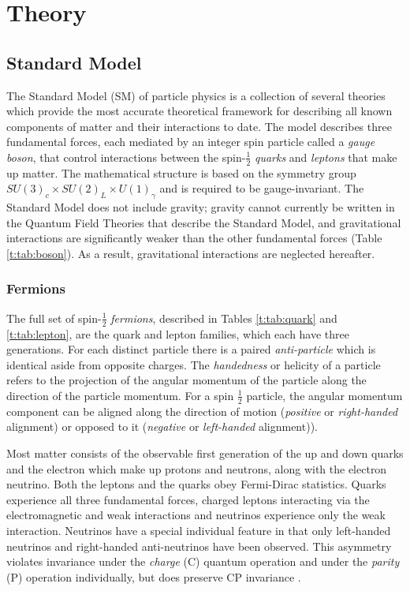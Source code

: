 \chapter{Theory}\label{c:Theory}

\section{Standard Model}


The Standard Model (SM) of particle physics is a collection of several theories which provide the most accurate theoretical framework for describing all known components of matter and their interactions to date. The model describes three fundamental forces, each mediated by an integer spin particle called a \textit{gauge boson}, that control interactions between the spin-$\frac{1}{2}$ \textit{quarks} and \textit{leptons} that make up matter. The mathematical structure is  based on the symmetry group $SU(3)_c\times SU(2)_L\times U(1)_\gamma$ and is required to be gauge-invariant. The Standard Model does not include gravity; gravity cannot currently be written in the Quantum Field Theories that describe the Standard Model, and gravitational interactions are significantly weaker than the other fundamental forces (Table \ref{t:tab:boson}). As a result, gravitational interactions are neglected hereafter.

	\subsection{Fermions}

		The full set of spin-$\frac{1}{2}$ \textit{fermions}, described in Tables \ref{t:tab:quark} and \ref{t:tab:lepton}, are the quark and lepton families, which each have three generations. For each distinct particle there is a paired \textit{anti-particle} which is identical aside from opposite charges. The \textit{handedness} or helicity of a particle refers to the projection of the angular momentum of the particle along the direction of the particle momentum. For a spin $\frac{1}{2}$ particle, the angular momentum component can be aligned along the direction of motion (\textit{positive} or \textit{right-handed} alignment) or opposed to it (\textit{negative} or \textit{left-handed} alignment)).

		Most matter consists of the observable first generation of the up and down quarks and the electron which make up protons and neutrons, along with the electron neutrino. Both the leptons and the quarks obey Fermi-Dirac statistics. Quarks experience all three fundamental forces, charged leptons interacting via the electromagnetic and weak interactions and neutrinos experience only the weak interaction. Neutrinos have a special individual feature in that only left-handed neutrinos and right-handed anti-neutrinos have been observed. This asymmetry violates invariance under the \textit{charge} (C) quantum operation and under the \textit{parity} (P) operation individually, but does preserve CP invariance \cite{martinshaw}.

